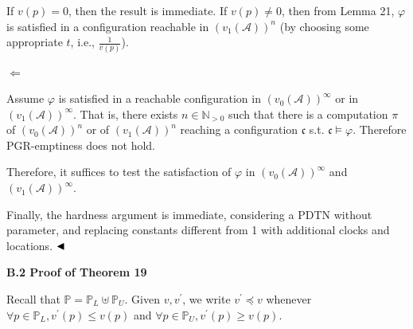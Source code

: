  
 
If $v(p)=0$, then the result is immediate. If $v(p)\neq 0$, then from Lemma 21, $\varphi$ is satisfied in a configuration reachable in ${(v_{1}(\mathcal{A}))}^{n}$ (by choosing some appropriate $t$, i.e., $\frac{1}{v(p)}$).\par
 
  $\Leftarrow$  
 
Assume $\varphi$ is satisfied in a reachable configuration in ${(v_{0}(\mathcal{A}))}^{\infty}$ or in ${(v_{1}(\mathcal{A}))}^{\infty}$. That is, there exists $n\in\mathbb{N}_{>0}$ such that there is a computation $\pi$ of ${(v_{0}(\mathcal{A}))}^{n}$ or of ${(v_{1}(\mathcal{A}))}^{n}$ reaching a configuration $\mathfrak{c}$ s.t. $\mathfrak{c}\models\varphi$. Therefore PGR-emptiness does not hold.\par
 
   
Therefore, it suffices to test the satisfaction of $\varphi$ in ${(v_{0}(\mathcal{A}))}^{\infty}$ and ${(v_{1}(\mathcal{A}))}^{\infty}$.\par
 
 
 
Finally, the hardness argument is immediate, considering a PDTN without parameter, and replacing constants different from 1 with additional clocks and locations. $\hfill\blacktriangleleft$\par
 
 
 
 
 
\par\medskip\noindent\textbf{B.2 Proof of Theorem 19}\par
 
 
Recall that $\mathbb{P}=\mathbb{P}_{L}\uplus\mathbb{P}_{U}$. Given $v,v^{\prime}$, we write $v^{\prime}\preceq v$ whenever $\forall p\in\mathbb{P}_{L},v^{\prime}(p)\leq v(p)$ and $\forall p\in\mathbb{P}_{U},v^{\prime}(p)\geq v(p)$.\par
 
 
 
